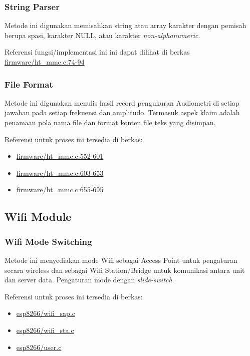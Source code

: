 \documentclass[12pt,]{article}
\begin{document}
	\subsubsection{String Parser}
	
	Metode ini digunakan memisahkan string atau array karakter dengan pemisah berupa spasi, karakter NULL, atau karakter \textit{non-alphanumeric}.
	
	Referensi fungsi/implementasi ini ini dapat dilihat di berkas
	\href{https://github.com/VibrasticLab/pikoakustik/blob/stm32f401re_3pin/firmware/ht_mmc.c#L74-L94}{firmware/ht\_mmc.c:74-94}
	
	\subsubsection{File Format}
	
	Metode ini digunakan menulis hasil record pengukuran Audiometri di setiap jawaban pada setiap frekuensi dan amplitudo.
	Termasuk aspek klaim adalah penamaan pola nama file dan format konten file teks yang disimpan.
	
	Referensi untuk proses ini tersedia di berkas:
	\begin{itemize}
		\item \href{https://github.com/VibrasticLab/pikoakustik/blob/stm32f401re_3pin/firmware/ht_mmc.c#L522-L601}{firmware/ht\_mmc.c:552-601}
		\item \href{https://github.com/VibrasticLab/pikoakustik/blob/stm32f401re_3pin/firmware/ht_mmc.c#L603-L653}{firmware/ht\_mmc.c:603-653}
		\item \href{https://github.com/VibrasticLab/pikoakustik/blob/stm32f401re_3pin/firmware/ht_mmc.c#L655-L695}{firmware/ht\_mmc.c:655-695}
	\end{itemize}

	\subsection{Wifi Module}
	
	\subsubsection{Wifi Mode Switching}
	
	Metode ini menyediakan mode Wifi sebagai Access Point untuk pengaturan secara wireless
	dan sebagai Wifi Station/Bridge untuk komunikasi antara unit dan server data.
	Pengaturan mode dengan \textit{slide-switch}.
	
	Referensi untuk proses ini tersedia di berkas:
	\begin{itemize}
		\item \href{https://github.com/VibrasticLab/pikoakustik/blob/stm32f401re_3pin/esp8266/user/wifi_sap.c}{esp8266/wifi\_sap.c}
		\item \href{https://github.com/VibrasticLab/pikoakustik/blob/stm32f401re_3pin/esp8266/user/wifi_sta.c}{esp8266/wifi\_sta.c}
		\item \href{https://github.com/VibrasticLab/pikoakustik/blob/stm32f401re_3pin/esp8266/user/wifi_sta.c}{esp8266/user.c}
	\end{itemize}
\end{document}
